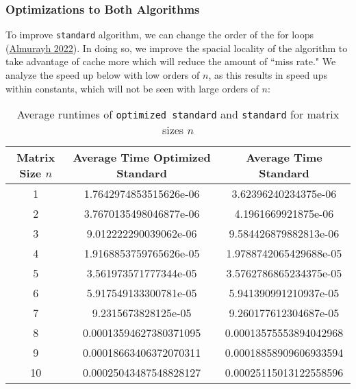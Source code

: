 \documentclass[11pt]{scrartcl}
\theoremstyle{dotlessP}
\theoremstyle{dotlessN}
\theoremstyle{dotN}
\begin{document}
\subsubsection{Optimizations to Both Algorithms}
To improve \texttt{standard} algorithm, we can change the order of the for loops (\href{https://www.researchgate.net/publication/364318412_Improved_Matrix_Multiplication_by_Changing_Loop_Order}{Almurayh 2022}). In doing so, we improve the spacial locality of the algorithm to take advantage of cache more which will reduce the amount of ``miss rate." We analyze the speed up below with low orders of $n$, as this results in speed ups within constants, which will not be seen with large orders of $n$:
\begin{table}
\begin{tabular}{c|c|c}
    Matrix Size $n$ & Average Time Optimized Standard & Average Time Standard \\
\hline
1 & 1.7642974853515626e-06 & 3.62396240234375e-06 \\
2 & 3.7670135498046877e-06 & 4.1961669921875e-06 \\
3 & 9.012222290039062e-06 & 9.584426879882813e-06 \\
4 & 1.9168853759765626e-05 & 1.9788742065429688e-05 \\
5 & 3.561973571777344e-05 & 3.5762786865234375e-05 \\
6 & 5.917549133300781e-05 & 5.941390991210937e-05 \\
7 & 9.2315673828125e-05 & 9.260177612304687e-05 \\
8 & 0.00013594627380371095 & 0.00013575553894042968 \\
9 & 0.00018663406372070311 & 0.00018858909606933594 \\
10 & 0.00025043487548828127 & 0.00025115013122558596 \\
\end{tabular}
\caption{Average runtimes of \texttt{optimized standard} and \texttt{standard} for matrix sizes $n$}
\end{table}
\end{document}
